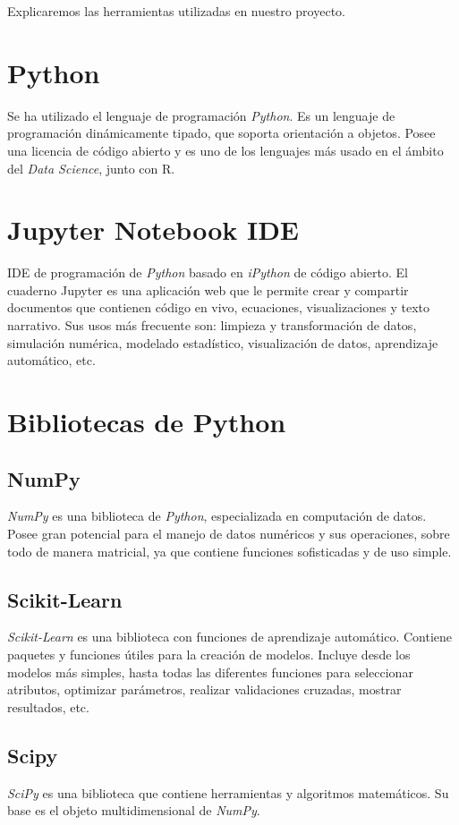 
Explicaremos las herramientas utilizadas en nuestro proyecto.

\section{Python}
Se ha utilizado el lenguaje de programación \textit{Python}. Es un lenguaje de programación dinámicamente tipado, que soporta orientación a objetos. Posee una licencia de código abierto y es uno de los lenguajes más usado en el ámbito del \textit{Data Science}, junto con R.

\section{Jupyter Notebook IDE}
IDE de programación de \textit{Python} basado en \textit{iPython} de código abierto. El cuaderno Jupyter es una aplicación web que le permite crear y compartir documentos que contienen código en vivo, ecuaciones, visualizaciones y texto narrativo. Sus usos más frecuente son: limpieza y transformación de datos, simulación numérica, modelado estadístico, visualización de datos, aprendizaje automático, etc.

\section{Bibliotecas de Python}
\subsection{NumPy}
\textit{NumPy} \cite{tool:numpy} es una biblioteca de \textit{Python}, especializada en computación de datos. Posee gran potencial para el manejo de datos numéricos y sus operaciones, sobre todo de manera matricial, ya que contiene funciones sofisticadas y de uso simple.

\subsection{Scikit-Learn}
\textit{Scikit-Learn} \cite{tool:scikit-learn} es una biblioteca con funciones de aprendizaje automático. Contiene paquetes y funciones útiles para la creación de modelos. Incluye desde los modelos más simples, hasta todas las diferentes funciones para seleccionar atributos, optimizar parámetros, realizar validaciones cruzadas, mostrar resultados, etc.

\subsection{Scipy}
\textit{SciPy} \cite{tool:scipy} es una biblioteca que contiene herramientas y algoritmos matemáticos. Su base es el objeto multidimensional de \textit{NumPy}.


